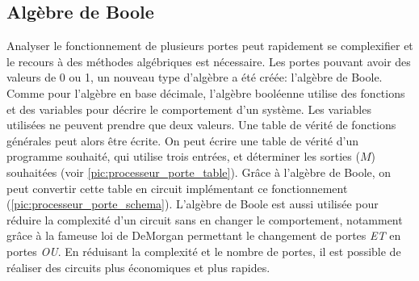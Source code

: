 \subsection{Algèbre de Boole}
Analyser le fonctionnement de plusieurs portes peut rapidement se complexifier et le recours à des méthodes algébriques est nécessaire. Les portes pouvant avoir des valeurs de 0 ou 1, un nouveau type d'algèbre a été créée: l'algèbre de Boole. Comme pour l'algèbre en base décimale, l'algèbre booléenne utilise des fonctions et des variables pour décrire le comportement d'un système. Les variables utilisées ne peuvent prendre que deux valeurs. Une table de vérité de fonctions générales peut alors être écrite. On peut écrire une table de vérité d'un programme souhaité, qui utilise trois entrées, et déterminer les sorties ($M$) souhaitées (voir \autoref{pic:processeur_porte_table}). Grâce à l'algèbre de Boole, on peut convertir cette table en circuit implémentant ce fonctionnement (\autoref{pic:processeur_porte_schema}).
L'algèbre de Boole est aussi utilisée pour réduire la complexité d'un circuit sans en changer le comportement, notamment grâce à la fameuse loi de DeMorgan \cite{hurley2014concise} permettant le changement de portes \textit{ET} en portes \textit{OU}. En réduisant la complexité et le nombre de portes, il est possible de réaliser des circuits plus économiques et plus rapides.


